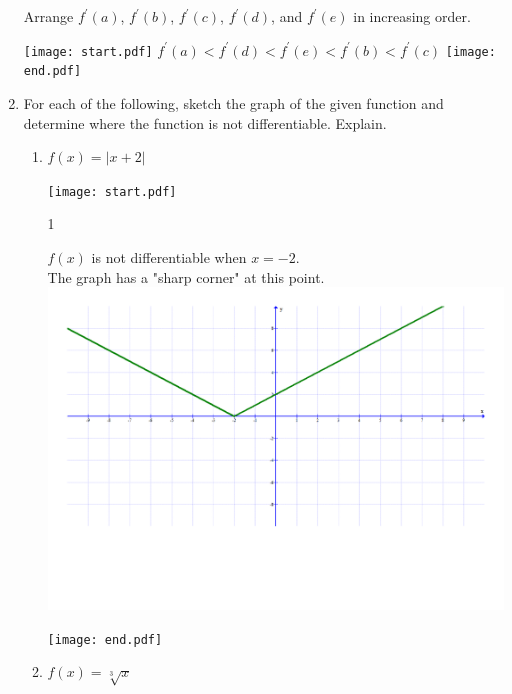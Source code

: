 \documentclass[12pt]{article}
\begin{document}
\begin{enumerate}
Arrange $f^{\prime}(a)$, $f^{\prime}(b)$, $f^{\prime}(c)$, $f^{\prime}(d)$, and $f^{\prime}(e)$ in increasing order.

\texttt{[image: start.pdf]}
{{$f^{\prime}(a)<f^{\prime}(d)<f^{\prime}(e)<f^{\prime}(b)<f^{\prime}(c)$}}
\texttt{[image: end.pdf]}


\item For each of the following, sketch the graph of the given function and determine where the function is not differentiable. Explain.

\begin{enumerate}

\item $f(x) = |x+2|$ 

\texttt{[image: start.pdf]}
{{{1\linewidth}{\begin{center}
$f(x)$ is not differentiable when $x=-2$.\\
The graph has a "sharp corner" at this point.\\
\includegraphics[scale=0.4]{ndiff1.pdf}
\end{center}}}}
\texttt{[image: end.pdf]}


\item $\displaystyle f(x) = \sqrt[3]{x}$ 


\end{enumerate}
\end{enumerate}
\end{document}
